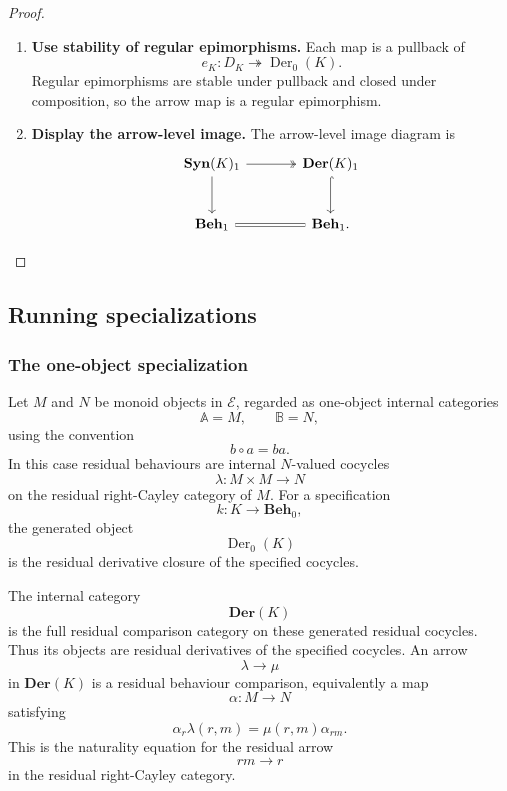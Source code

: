 \begin{proof}
\begin{enumerate}
        \item \textbf{Use stability of regular epimorphisms.} Each map is a pullback of
        \[
            e_K:D_K\twoheadrightarrow\operatorname{Der}_0(K).
        \]
        Regular epimorphisms are stable under pullback and closed under composition, so the arrow map is a regular epimorphism.

        \item \textbf{Display the arrow-level image.} The arrow-level image diagram is
        \[
            \begin{tikzcd}[column sep=large, row sep=large]
                    \mathbf{Syn}(K)_1
                        \arrow[r, two heads]
                        \arrow[d]
                &
                    \mathbf{Der}(K)_1
                        \arrow[d, hook]
                \\
                    \mathbf{Beh}_1
                        \arrow[r, equal]
                &
                    \mathbf{Beh}_1.
            \end{tikzcd}
        \]
    \end{enumerate}
\end{proof}

\subsection{Running specializations}
\label{subsec:generated-categories-running-specializations}

\subsubsection{The one-object specialization}

Let \(M\) and \(N\) be monoid objects in \(\mathcal E\), regarded as one-object internal categories
\[
    \mathbb A=M,
    \qquad
    \mathbb B=N,
\]
using the convention
\[
    b\circ a=ba.
\]
In this case residual behaviours are internal \(N\)-valued cocycles
\[
    \lambda:M\times M\to N
\]
on the residual right-Cayley category of \(M\). For a specification
\[
    k:K\to\mathbf{Beh}_0,
\]
the generated object
\[
    \operatorname{Der}_0(K)
\]
is the residual derivative closure of the specified cocycles.

The internal category
\[
    \mathbf{Der}(K)
\]
is the full residual comparison category on these generated residual cocycles. Thus its objects are residual derivatives of the specified cocycles. An arrow
\[
    \lambda\to\mu
\]
in \(\mathbf{Der}(K)\) is a residual behaviour comparison, equivalently a map
\[
    \alpha:M\to N
\]
satisfying
\[
    \alpha_r\lambda(r,m)=\mu(r,m)\alpha_{rm}.
\]
This is the naturality equation for the residual arrow
\[
    rm\longrightarrow r
\]
in the residual right-Cayley category.

